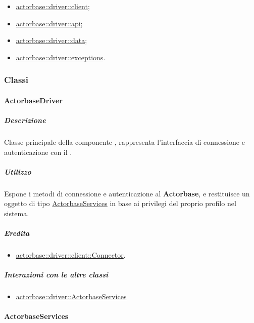 \documentclass{scalatekids-article}
\begin{document}
\begin{itemize}
\item \hyperref[sec:actorbase::driver::client]{actorbase::driver::client};
\item \hyperref[sec:actorbase::driver::api]{actorbase::driver::api};
\item \hyperref[sec:actorbase::driver::data]{actorbase::driver::data};
\item \hyperref[sec:actorbase::driver::exceptions]{actorbase::driver::exceptions}.
\end{itemize}

\subsubsection{Classi}

\paragraph{ActorbaseDriver}
\label{sec:actorbase::driver::ActorbaseDriver}

\subparagraph{Descrizione}

Classe principale della componente , rappresenta l'interfaccia
di connessione e autenticazione con il .

\subparagraph{Utilizzo}

Espone i metodi di connessione e autenticazione al  \textbf{Actorbase}, e restituisce un oggetto
di tipo \hyperref[sec::actorbase::driver::ActorbaseServices]{ActorbaseServices} in base ai privilegi del proprio
profilo nel sistema.

\subparagraph{Eredita}

\begin{itemize}
\item \hyperref[sec:actorbase::driver::client::Connector]{actorbase::driver::client::Connector}.
\end{itemize}

\subparagraph{Interazioni con le altre classi}

\begin{itemize}
\item \hyperref[sec::actorbase::driver::ActorbaseServices]{actorbase::driver::ActorbaseServices}
\end{itemize}

\paragraph{ActorbaseServices}
\label{sec:actorbase::driver::ActorbaseServices}
\end{document}
